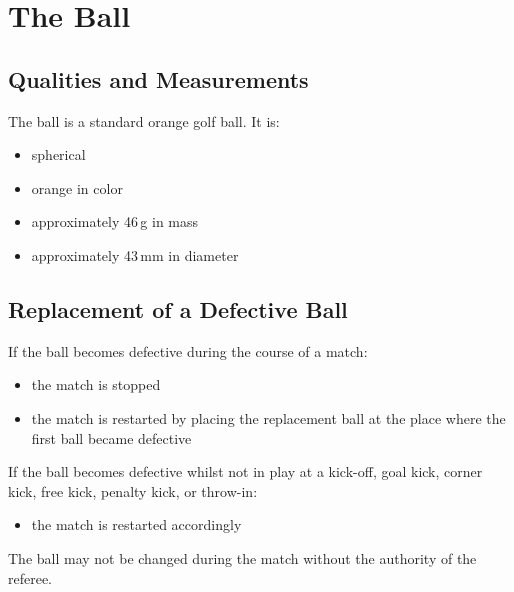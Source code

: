 \section{The Ball}\label{sec:ball}

\subsection{Qualities and Measurements}
The ball is a standard orange golf ball.
It is:
\begin{itemize}
\item spherical
\item orange in color
\item approximately 46\,g in mass
\item approximately 43\,mm in diameter
\end{itemize}

\subsection{Replacement of a Defective Ball}
If the ball becomes defective during the course of a match:
\begin{itemize}
\item the match is stopped
\item the match is restarted by placing the replacement ball at the place where the first ball became defective
\end{itemize}

If the ball becomes defective whilst not in play at a kick-off, goal kick, corner kick, free kick, penalty kick, or throw-in:
\begin{itemize}
\item the match is restarted accordingly
\end{itemize}

The ball may not be changed during the match without the authority of the referee.